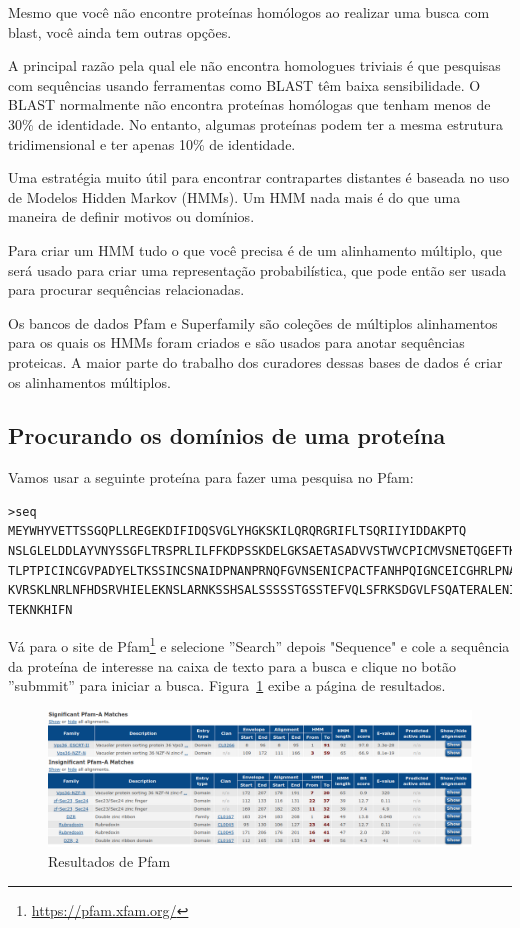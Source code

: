 \documentclass[letter,11pt]{book}
\begin{document}
Mesmo que você não encontre proteínas homólogos ao realizar uma busca com blast, você ainda tem outras opções.

A principal razão pela qual ele não encontra homologues triviais é que pesquisas com sequências usando ferramentas como BLAST têm baixa sensibilidade. O BLAST normalmente não encontra proteínas homólogas que tenham menos de 30\% de identidade. No entanto, algumas proteínas podem ter a mesma estrutura tridimensional e ter apenas 10\% de identidade.

Uma estratégia muito útil para encontrar contrapartes distantes é baseada no uso de Modelos Hidden Markov (HMMs). Um HMM nada mais é do que uma maneira de definir motivos ou domínios.

Para criar um HMM tudo o que você precisa é de um alinhamento múltiplo, que será usado para criar uma representação probabilística, que pode então ser usada para procurar sequências relacionadas.

Os bancos de dados Pfam \citep{Finn2010} e {\sc Superfamily} \citep{Wilson2009} são coleções de múltiplos alinhamentos para os quais os HMMs foram criados e são usados para anotar sequências proteicas. A maior parte do trabalho dos curadores dessas bases de dados é criar os alinhamentos múltiplos.

\subsection{Procurando os domínios de uma proteína}

Vamos usar a seguinte proteína para fazer uma pesquisa no Pfam:

\begin{Verbatim}[commandchars=!\{\},label=proteína desconhecida,frame=topline,fontsize=\scriptsize]
>seq
MEYWHYVETTSSGQPLLREGEKDIFIDQSVGLYHGKSKILQRQRGRIFLTSQRIIYIDDAKPTQ
NSLGLELDDLAYVNYSSGFLTRSPRLILFFKDPSSKDELGKSAETASADVVSTWVCPICMVSNETQGEFTKD
TLPTPICINCGVPADYELTKSSINCSNAIDPNANPRNQFGVNSENICPACTFANHPQIGNCEICGHRLPNAS
KVRSKLNRLNFHDSRVHIELEKNSLARNKSSHSALSSSSSTGSSTEFVQLSFRKSDGVLFSQATERALENIL 
TEKNKHIFN
\end{Verbatim} 

Vá para o site de Pfam\footnote{\url{https://pfam.xfam.org/}} e selecione ''Search'' depois "Sequence"  e cole a sequência da proteína de interesse na caixa de texto para a busca e clique no botão ''submmit'' para iniciar a busca. Figura~\ref{PfamResults} exibe a página de resultados.

\begin{figure}[h!]
\centering
 \includegraphics[width=14cm]{Figs/PfamResults.png}
 \caption{\label{PfamResults}Resultados de Pfam}
\end{figure}
\end{document}
